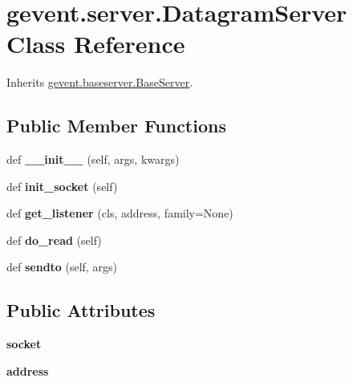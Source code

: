 \hypertarget{classgevent_1_1server_1_1_datagram_server}{}\section{gevent.\+server.\+Datagram\+Server Class Reference}
\label{classgevent_1_1server_1_1_datagram_server}


Inherits \hyperlink{classgevent_1_1baseserver_1_1_base_server}{gevent.\+baseserver.\+Base\+Server}.

\subsection*{Public Member Functions}
\begin{DoxyCompactItemize}
\item 
\mbox{\label{classgevent_1_1server_1_1_datagram_server_acf750a238e35624e38178224f7e56fee}} 
def {\bfseries \+\_\+\+\_\+init\+\_\+\+\_\+} (self, args, kwargs)
\item 
\mbox{\label{classgevent_1_1server_1_1_datagram_server_aae4bf3f75990a9c0fb753629043efe01}} 
def {\bfseries init\+\_\+socket} (self)
\item 
\mbox{\label{classgevent_1_1server_1_1_datagram_server_a0813a0417a29625aa7b02a095565d752}} 
def {\bfseries get\+\_\+listener} (cls, address, family=None)
\item 
\mbox{\label{classgevent_1_1server_1_1_datagram_server_ad8fa48980cf44f3278df6eff53d5336a}} 
def {\bfseries do\+\_\+read} (self)
\item 
\mbox{\label{classgevent_1_1server_1_1_datagram_server_ab85d7a4cabcff0e92e7c32d620107611}} 
def {\bfseries sendto} (self, args)
\end{DoxyCompactItemize}
\subsection*{Public Attributes}
\begin{DoxyCompactItemize}
\item 
\mbox{\label{classgevent_1_1server_1_1_datagram_server_a055ca70e87410a5821028f1f54e31e27}} 
{\bfseries socket}
\item 
\mbox{\label{classgevent_1_1server_1_1_datagram_server_add52701b4c065e7e7cff197ac6a83323}} 
{\bfseries address}
\end{DoxyCompactItemize}
